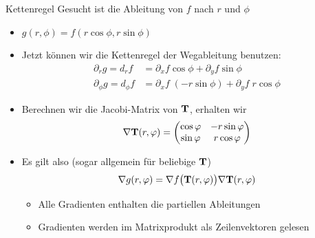 \begin{frame}{Kettenregel}
  Gesucht ist die Ableitung von $f$ nach $r$ und $\phi$
  \begin{itemize}
  \item $g(r,\phi)= f(r\cos\phi,r\sin\phi)$
  \item Jetzt können wir die Kettenregel der Wegableitung benutzen:
    \begin{align*}
      \partial_r g = d_r f
      &= \partial_x f\cos\phi+\partial_y f \sin\phi\\
      \partial_\phi g = d_\phi f
      &= \partial_x f\; (-r\sin\phi) + \partial_y f\; r \cos \phi
    \end{align*}
  \item Berechnen wir die Jacobi-Matrix von $\mathbf{T}$, erhalten wir
    \begin{gather*}
      \nabla \mathbf{T}(r,\varphi) =
      \begin{pmatrix}
        \cos \varphi & -r \sin \varphi \\
        \sin \varphi & r \cos \varphi
      \end{pmatrix}      
    \end{gather*}
  \item Es gilt also (sogar allgemein für beliebige $\mathbf{T}$)
    \begin{gather*}
      \nabla g(r,\varphi)
      = \nabla f\bigl(\mathbf{T}(r,\varphi)\bigr) \nabla \mathbf{T}(r,\varphi)
    \end{gather*}
    \begin{itemize}
    \item Alle Gradienten enthalten die partiellen Ableitungen
    \item Gradienten werden im Matrixprodukt als Zeilenvektoren gelesen
    \end{itemize}
  \end{itemize}
\end{frame}

